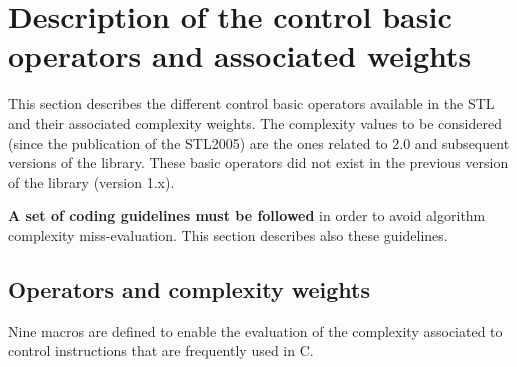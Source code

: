 \section{Description of the control basic operators and associated weights}

This section describes the different control basic operators
available in the STL and their associated complexity weights. The
complexity values to be considered (since the publication of the
STL2005) are the ones related to 2.0 and subsequent versions of the library.
These basic operators did not exist in the previous version of the
library (version 1.x).

\textbf{A set of coding guidelines must be followed} in order to
avoid algorithm complexity miss-evaluation. This section describes
also these guidelines.

\subsection{Operators and complexity weights}
Nine macros are defined to enable the evaluation of the complexity
associated to control instructions that are frequently used in C.


